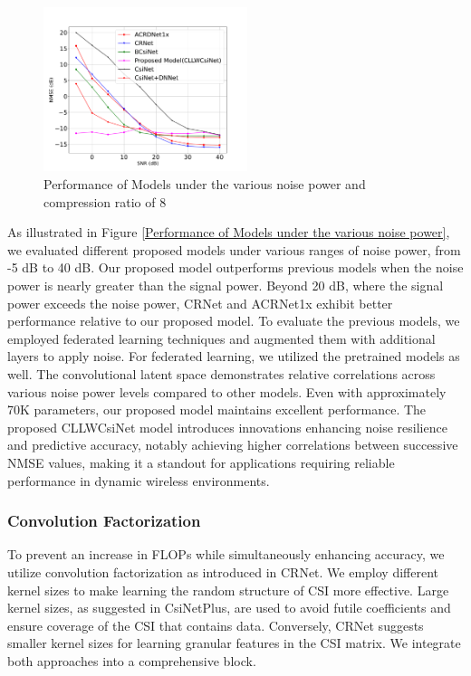 \documentclass[lettersize,journal]{IEEEtran}
\begin{document}
\begin{figure}
	\centering
	\includegraphics[width=0.53\textwidth]{Figure_1.pdf}
	\caption{Performance of Models under the various noise power and compression ratio of 8}
	\label{fig:Performance of Models under the various noise power}
\end{figure}

As illustrated in Figure \ref{Performance of Models under the various noise power}, we evaluated different proposed models under various ranges of noise power, from -5 dB to 40 dB. Our proposed model outperforms previous models when the noise power is nearly greater than the signal power. Beyond 20 dB, where the signal power exceeds the noise power, CRNet \cite{abn} and ACRNet1x \cite{abx} exhibit better performance relative to our proposed model. To evaluate the previous models, we employed federated learning techniques and augmented them with additional layers to apply noise. For federated learning, we utilized the pretrained models as well. The convolutional latent space demonstrates relative correlations across various noise power levels compared to other models. Even with approximately 70K parameters, our proposed model maintains excellent performance. The proposed CLLWCsiNet model introduces innovations enhancing noise resilience and predictive accuracy, notably achieving higher correlations between successive NMSE values, making it a standout for applications requiring reliable performance in dynamic wireless environments.


\subsubsection{Convolution Factorization} To prevent an increase in FLOPs while simultaneously enhancing accuracy, we utilize convolution factorization as introduced in CRNet\cite{abn}. We employ different kernel sizes to make learning the random structure of CSI more effective. Large kernel sizes, as suggested in CsiNetPlus\cite{abo}, are used to avoid futile coefficients and ensure coverage of the CSI that contains data. Conversely, CRNet\cite{abn} suggests smaller kernel sizes for learning granular features in the CSI matrix. We integrate both approaches into a comprehensive block.
\end{document}
